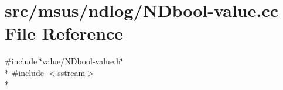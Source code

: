 \hypertarget{_n_dbool-value_8cc}{\section{src/msus/ndlog/\-N\-Dbool-\/value.cc File Reference}
\label{_n_dbool-value_8cc}
}
{\ttfamily \#include \char`\"{}value/\-N\-Dbool-\/value.\-h\char`\"{}}\\*
{\ttfamily \#include $<$sstream$>$}\\*
